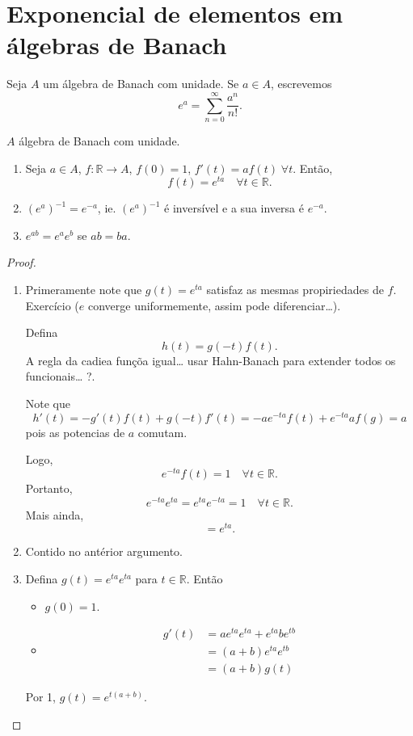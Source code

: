 \documentclass[portuguese]{article}
\theoremstyle{definition}
\newcommand{\R}{\mathbb{R}}
\begin{document}
\section{Exponencial de elementos em álgebras de Banach}
\begin{defn}
	Seja $A$ um álgebra de Banach com unidade. Se $a\in A$, escrevemos
	\[e^a=\sum_{n=0}^\infty\frac{a^n}{n!}.\]
\end{defn}
\begin{teo}
	$A$ álgebra de Banach com unidade.
	\begin{enumerate}
		\item Seja $a\in A$, $f:\R\to A$, $f(0)=1$, $f'(t)=af(t)\;\forall t$. Então,
		\[f(t)=e^{ta}\quad\forall t\in\R.\]
		\item $(e^{a})^{-1}=e^{-a}$, ie. $(e^{a})^{-1}$ é inversível e a sua inversa é $e^{-a}$.
		\item  $e^{ab}=e^ae^b$ se $ab=ba$.
	\end{enumerate}
\end{teo}
\begin{proof}\leavevmode
	\begin{enumerate}
		\item Primeramente note que $g(t)=e^{ta}$ satisfaz as mesmas propiriedades de $f$. {\color{orange} Exercício ($e$ converge uniformemente, assim pode diferenciar…).}
		
		Defina
		\[h(t)=g(-t)f(t).\]
		{\color{orange}A regla da cadiea funçõa igual… usar Hahn-Banach para extender todos os funcionais… ?}.
		
		Note que
		\[h'(t)=-g'(t)f(t)+g(-t)f'(t)=-ae^{-ta}f(t)+e^{-ta}af(g)=a\]
		pois as potencias de $a$ comutam.
		
		Logo,
		\[e^{-ta}f(t)=1\quad\forall t\in\R.\]
		Portanto,
		\[e^{-ta}e^{ta}=e^{ta}e^{-ta}=1\quad\forall t\in \R.\]
		Mais ainda,
		\[=e^{ta}.\]
		
		\item Contido no antérior argumento.
		\item Defina $g(t)=e^{ta}e^{ta}$ para $t\in\R$. Então
		\begin{itemize}
			\item $g(0)=1$.
			\item \begin{align*}
				g'(t)&=ae^{ta}e^{ta}+e^{ta}be^{tb}\\
				&=(a+b)e^{ta}e^{tb}\\
				&=(a+b)g(t)
			\end{align*}
		\end{itemize}
		Por 1, $g(t)=e^{t(a+b)}$.
	\end{enumerate}
\end{proof}
\end{document}
